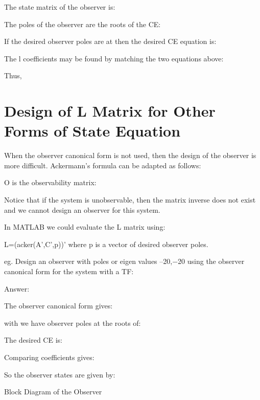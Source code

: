 The state matrix of the observer is:
 
 
The poles of the observer are the roots of the CE:

 

If the desired observer poles are at  
then the desired CE equation is:

 

The  l  coefficients may be found by matching the two equations above:

Thus,

 




\section*{Design of $\mathbf{L}$ Matrix for Other Forms of State Equation} %
\label{sec:design_of_l_matrix_for_other_forms_of_state_equation}


When the observer canonical form is not used, then the design of the observer is more difficult. Ackermann's formula can be adapted as follows:

 

O is the observability matrix:
 

 

Notice that if the system is unobservable, then the matrix inverse does not exist and we cannot design an observer for this system.

In MATLAB we could evaluate the L matrix using:

L=(acker(A',C',p))'  where  p  is a vector of desired observer poles.
 
eg.  Design an observer with poles or eigen values
–20,−20 using the observer canonical form for the system with a TF:
 
Answer:

The observer canonical form gives:

 

with     we have observer poles at the roots of:

 

The desired CE is:

 

 
Comparing coefficients gives:

 

So the observer states are given by:

 

Block Diagram of the Observer






